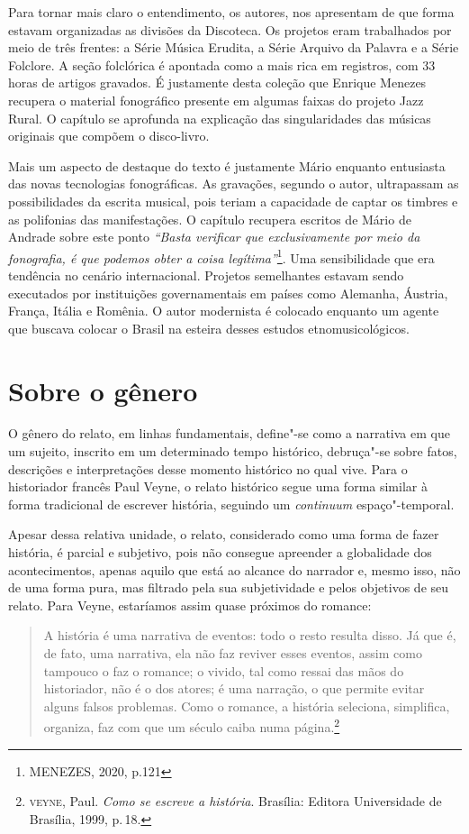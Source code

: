 Para tornar mais claro o entendimento, os autores, nos apresentam de que
forma estavam organizadas as divisões da Discoteca. Os projetos eram
trabalhados por meio de três frentes: a Série Música Erudita, a Série
Arquivo da Palavra e a Série Folclore. A seção folclórica é apontada
como a mais rica em registros, com 33 horas de artigos gravados. É
justamente desta coleção que Enrique Menezes recupera o material
fonográfico presente em algumas faixas do projeto Jazz Rural. O capítulo
se aprofunda na explicação das singularidades das músicas originais que
compõem o disco-livro.

Mais um aspecto de destaque do texto é justamente Mário enquanto
entusiasta das novas tecnologias fonográficas. As gravações, segundo o
autor, ultrapassam as possibilidades da escrita musical, pois teriam a
capacidade de captar os timbres e as polifonias das manifestações. O
capítulo recupera escritos de Mário de Andrade sobre este ponto
\emph{``Basta verificar que exclusivamente por meio da fonografia, é que
podemos obter a coisa legítima''}\footnote{MENEZES, 2020, p.121}. Uma
sensibilidade que era tendência no cenário internacional. Projetos
semelhantes estavam sendo executados por instituições governamentais em
países como Alemanha, Áustria, França, Itália e Romênia. O autor
modernista é colocado enquanto um agente que buscava colocar o Brasil na
esteira desses estudos etnomusicológicos.

\section{Sobre o gênero}

O gênero do relato, em linhas fundamentais, define"-se como a narrativa em que um sujeito, inscrito em um determinado tempo histórico, debruça"-se sobre fatos, descrições e interpretações desse momento histórico no qual vive. Para o historiador francês Paul Veyne, o relato histórico segue uma forma similar à forma tradicional de escrever história, seguindo um \textit{continuum} espaço"-temporal.

Apesar dessa relativa unidade, o relato, considerado como uma forma de fazer história,
é parcial e subjetivo, pois não consegue apreender a globalidade dos acontecimentos, apenas
aquilo que está ao alcance do narrador e, mesmo isso, não de uma forma pura, mas filtrado pela sua subjetividade e pelos objetivos de seu relato.
Para Veyne, estaríamos assim quase próximos do romance:

\begin{quote}
A história é uma narrativa de eventos: todo o resto resulta disso. Já que é, de fato, uma narrativa, ela não faz reviver esses eventos, assim como tampouco o faz o romance; o vivido, tal como ressai das mãos do historiador, não é o dos atores; é uma narração,
o que permite evitar alguns falsos problemas. Como o romance, a
história seleciona, simplifica, organiza, faz com que um século
caiba numa página.\footnote{\textsc{veyne}, Paul. \textit{Como se escreve a história}. Brasília: Editora Universidade de Brasília, 1999, p.\,18.}
\end{quote}


